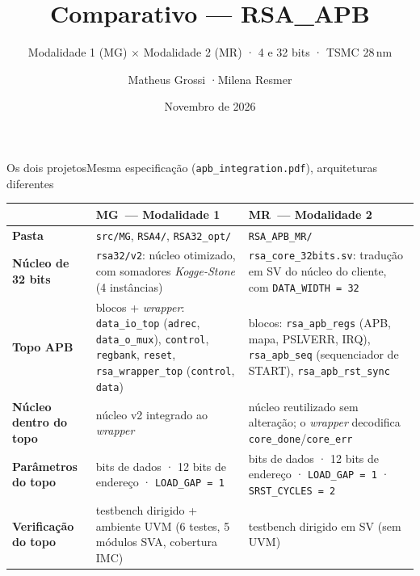 \documentclass[aspectratio=169,10pt,t]{beamer}
\title[Comparativo · RSA\_APB MG $\times$ MR]{Comparativo — RSA\_APB}
\subtitle{Modalidade 1 (MG) $\times$ Modalidade 2 (MR) · 4 e 32 bits · TSMC 28\,nm}
\author[Matheus Grossi · Milena Resmer]{Matheus Grossi \quad·\quad Milena Resmer}
\institute{TchêMOS — Semiconductor Design House}
\date{Novembro de 2026}
\newcommand{\MG}{\textbf{\color{tmCafe}MG}}
\newcommand{\MR}{\textbf{\color{tmVermelho}MR}}
\begin{document}
\begin{frame}
  \titlepage
\end{frame}

\begin{frame}{Os dois projetos}{Mesma especificação (\texttt{apb\_integration.pdf}), arquiteturas diferentes}
  \scriptsize
  \renewcommand{\arraystretch}{1.25}
  \begin{tabularx}{\textwidth}{@{}>{\bfseries}p{2.6cm} >{\raggedright\arraybackslash}X >{\raggedright\arraybackslash}X@{}}
    \toprule
     & \MG\ — Modalidade 1 & \MR\ — Modalidade 2 \\
    \midrule
    Pasta & \texttt{src/MG}, \texttt{RSA4/}, \texttt{RSA32\_opt/} & \texttt{RSA\_APB\_MR/} \\
    Núcleo de 32 bits & \texttt{rsa32/v2}: núcleo otimizado, com somadores \emph{Kogge-Stone} (4 instâncias) & \texttt{rsa\_core\_32bits.sv}: tradução em SV do núcleo do cliente, com \texttt{DATA\_WIDTH = 32} \\
    Topo APB & 5 blocos + \emph{wrapper}: \texttt{data\_io\_top} (\texttt{adrec}, \texttt{data\_o\_mux}), \texttt{control}, \texttt{regbank}, \texttt{reset}, \texttt{rsa\_wrapper\_top} (\texttt{control}, \texttt{data}) & 3 blocos: \texttt{rsa\_apb\_regs} (APB, mapa, PSLVERR, IRQ), \texttt{rsa\_apb\_seq} (sequenciador de START), \texttt{rsa\_apb\_rst\_sync} \\
    Núcleo dentro do topo & núcleo v2 integrado ao \emph{wrapper} & núcleo reutilizado sem alteração; o \emph{wrapper} decodifica \texttt{core\_done}/\texttt{core\_err} \\
    Parâmetros do topo & 32 bits de dados · 12 bits de endereço · \texttt{LOAD\_GAP = 1} & 32 bits de dados · 12 bits de endereço · \texttt{LOAD\_GAP = 1} · \texttt{SRST\_CYCLES = 2} \\
    Verificação do topo & testbench dirigido + ambiente UVM (6 testes, 5 módulos SVA, cobertura IMC) & testbench dirigido em SV (sem UVM) \\
    \bottomrule
  \end{tabularx}
\end{frame}
\end{document}
